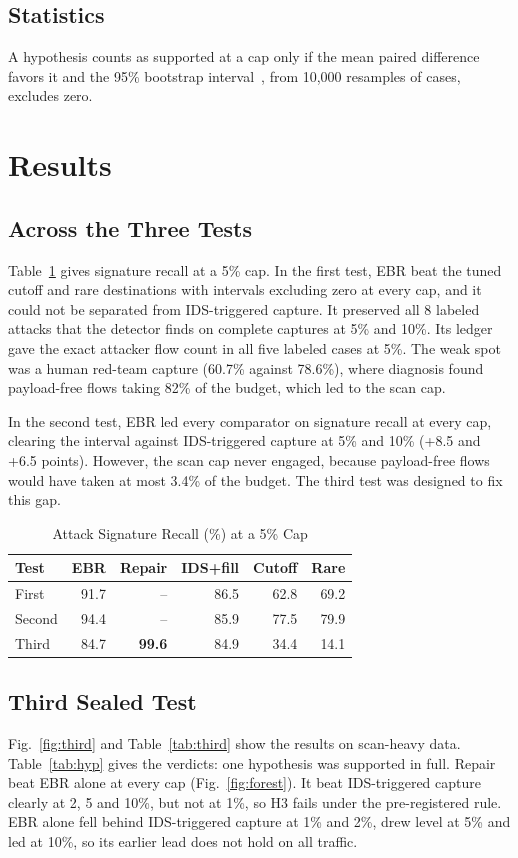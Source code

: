 \documentclass[conference]{IEEEtran}
\begin{document}
\subsection{Statistics}
A hypothesis counts as supported at a cap only if the mean paired difference favors it and the 95\% bootstrap interval~\cite{bootstrap}, from 10,000 resamples of cases, excludes zero.

\section{Results}
\subsection{Across the Three Tests}
Table~\ref{tab:all} gives signature recall at a 5\% cap. In the first test, EBR beat the tuned cutoff and rare destinations with intervals excluding zero at every cap, and it could not be separated from IDS-triggered capture. It preserved all 8 labeled attacks that the detector finds on complete captures at 5\% and 10\%. Its ledger gave the exact attacker flow count in all five labeled cases at 5\%. The weak spot was a human red-team capture (60.7\% against 78.6\%), where diagnosis found payload-free flows taking 82\% of the budget, which led to the scan cap.

In the second test, EBR led every comparator on signature recall at every cap, clearing the interval against IDS-triggered capture at 5\% and 10\% (+8.5 and +6.5 points). However, the scan cap never engaged, because payload-free flows would have taken at most 3.4\% of the budget. The third test was designed to fix this gap.

\begin{table}[t]
\centering
\caption{Attack Signature Recall (\%) at a 5\% Cap}
\label{tab:all}
\footnotesize
\begin{tabular}{@{}lrrrrr@{}}
\toprule
Test & EBR & Repair & IDS+fill & Cutoff & Rare\\
\midrule
First & 91.7 & -- & 86.5 & 62.8 & 69.2\\
Second & 94.4 & -- & 85.9 & 77.5 & 79.9\\
Third & 84.7 & \textbf{99.6} & 84.9 & 34.4 & 14.1\\
\bottomrule
\end{tabular}
\end{table}

\subsection{Third Sealed Test}
Fig.~\ref{fig:third} and Table~\ref{tab:third} show the results on scan-heavy data. Table~\ref{tab:hyp} gives the verdicts: one hypothesis was supported in full. Repair beat EBR alone at every cap (Fig.~\ref{fig:forest}). It beat IDS-triggered capture clearly at 2, 5 and 10\%, but not at 1\%, so H3 fails under the pre-registered rule. EBR alone fell behind IDS-triggered capture at 1\% and 2\%, drew level at 5\% and led at 10\%, so its earlier lead does not hold on all traffic.
\end{document}
